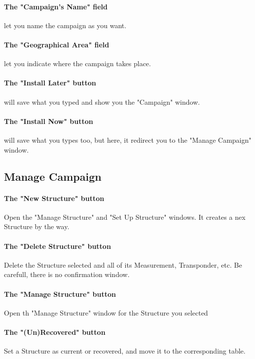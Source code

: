 \documentclass[11pt]{report}
\begin{document}
		    \paragraph{The "Campaign's Name" field} let you name the campaign as you want.
		    \paragraph{The "Geographical Area" field} let you indicate where the campaign takes place.
		    \paragraph{The "Install Later" button} will save what you typed and show you the "Campaign" window.
		    \paragraph{The "Install Now" button} will save what you types too, but here, it redirect you to the "Manage Campaign" window.

        \vspace{1cm}
		\subsection{Manage Campaign}
            \paragraph{The "New Structure" button} Open the "Manage Structure" and "Set Up Structure" windows. It creates a nex Structure by the way.
            \paragraph{The "Delete Structure" button} Delete the Structure selected and all of its Measurement, Transponder, etc. Be carefull, there is no confirmation window.
            \paragraph{The "Manage Structure" button}Open th "Manage Structure" window for the Structure you selected
            \paragraph{The "(Un)Recovered" button}Set a Structure as current or recovered, and move it to the corresponding table.
            
\end{document}
